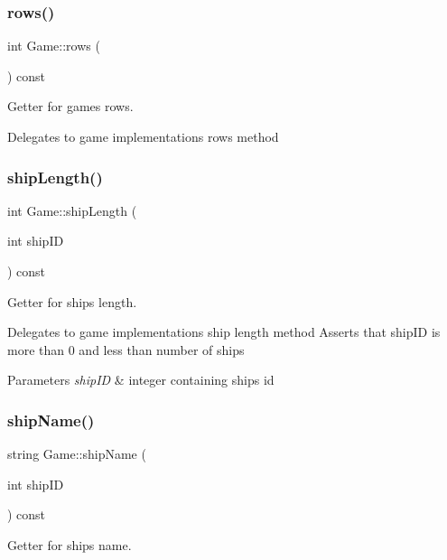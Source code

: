 \subsubsection{\texorpdfstring{rows()}{rows()}}
{\footnotesize\ttfamily int Game\+::rows (\begin{DoxyParamCaption}{ }\end{DoxyParamCaption}) const}



Getter for game\textquotesingle{}s rows. 

Delegates to game implementations rows method \mbox{\label{class_game_af447d664cda0ae50f98afaa1e75ec0e3}} 
\subsubsection{\texorpdfstring{ship\+Length()}{shipLength()}}
{\footnotesize\ttfamily int Game\+::ship\+Length (\begin{DoxyParamCaption}\item[{int}]{ship\+ID }\end{DoxyParamCaption}) const}



Getter for ship\textquotesingle{}s length. 

Delegates to game implementations ship length method Asserts that ship\+ID is more than 0 and less than number of ships 
\begin{DoxyParams}{Parameters}
{\em ship\+ID} & integer containing ship\textquotesingle{}s id \\
\hline
\end{DoxyParams}
\mbox{\label{class_game_aa652b00557acd25657c4aeface33d29a}} 
\subsubsection{\texorpdfstring{ship\+Name()}{shipName()}}
{\footnotesize\ttfamily string Game\+::ship\+Name (\begin{DoxyParamCaption}\item[{int}]{ship\+ID }\end{DoxyParamCaption}) const}



Getter for ship\textquotesingle{}s name. 

